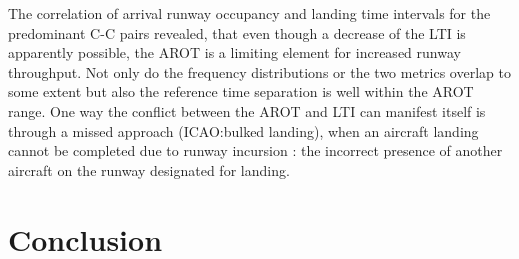 The correlation of arrival runway occupancy and landing time intervals for the predominant C-C pairs revealed, that even though a decrease of the LTI is apparently possible, the AROT is a limiting element for increased runway throughput. Not only do the frequency distributions or the two metrics overlap to some extent but also the reference time separation is well within the AROT range. One way the conflict between the AROT and LTI can manifest itself is through a missed approach (ICAO:bulked landing), when an aircraft landing cannot be completed due to runway incursion \cite{doc44444}: the incorrect presence of another aircraft on the runway designated for landing.








\section{Conclusion\label{sec:conclusions}}





